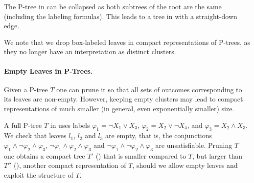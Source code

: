 The P-tree in  can be collapsed as both 
subtrees of the root are the same (including the labeling formulas). This 
leads to a tree in  with a straight-down edge.
We note that we drop box-labeled leaves in compact representations 
of P-trees, as they no longer have an interpretation as distinct clusters.

\paragraph{\bf Empty Leaves in P-Trees.} Given a P-tree $T$ one can prune it
so that all sets of outcomes corresponding to its leaves are non-empty.
However, keeping empty clusters may lead to compact representations of much
smaller (in general, even exponentially smaller) size.

A full P-tree $T$ in  uses labels
$\varphi_1=\neg X_1 \vee X_3$, $\varphi_2=X_2 \vee \neg X_4$, and
$\varphi_3=X_2 \wedge X_3$.
We check that leaves $l_1$, $l_2$ and $l_3$ are empty, that is,
the conjunctions $\varphi_1 \wedge \neg \varphi_2 \wedge \varphi_3$,
$\neg \varphi_1 \wedge \varphi_2 \wedge \varphi_3$ and
$\neg \varphi_1 \wedge \neg \varphi_2 \wedge \varphi_3$ are
unsatisfiable.
Pruning $T$ one obtains a compact tree $T'$ () that is
smaller compared to $T$, but larger than $T''$ (), another compact 
representation of $T$, should we allow empty leaves and exploit
the structure of $T$.

